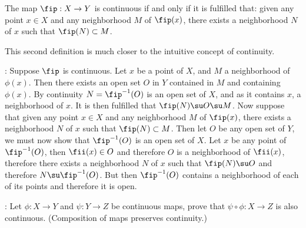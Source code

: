 \bteo The map $\fip:X \to Y$ is continuous if and only if it is fulfilled that: given any point $x \in X$ and any neighborhood $M$ of $\fip(x)$, there exists a neighborhood $N$ of $x$ such that $\fip(N) \subset M$. \eteo

This second definition is much closer to the intuitive concept of continuity.

\pru: Suppose $\fip$ is continuous. Let $x$ be a point of $X$, and $M$ a neighborhood of $\phi(x)$. Then there exists an open set $O$ in $Y$ contained in $M$ and containing $\phi(x)$. By continuity $N = \fip^{-1}(O)$ is an open set of $X$, and as it contains $x$, a neighborhood of $x$. It is then fulfilled that $\fip(N) \su O \su M$. Now suppose that given any point $x \in X$ and any neighborhood $M$ of $\fip(x)$, there exists a neighborhood $N$ of $x$ such that $\fip(N) \subset M$. Then let $O$ be any open set of $Y$, we must now show that $\fip^{-1}(O)$ is an open set of $X$. Let $x$ be any point of $\fip^{-1}(O)$, then $\fii (x) \in O$ and therefore $O$ is a neighborhood of $\fii (x)$, therefore there exists a neighborhood $N$ of $x$ such that $\fip(N) \su O$ and therefore $N \su \fip^{-1}(O)$. But then $\fip^{-1}(O)$ contains a neighborhood of each of its points and therefore it is open.

\ejer: Let $\phi : X \to Y$ and $\psi : Y \to Z$ be continuous maps, prove that $\psi \circ \phi : X \to Z$ is also continuous. (Composition of maps preserves continuity.)

\espa %



